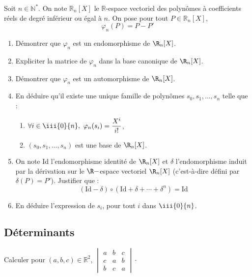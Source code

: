 \documentclass[a4paper,twoside,french,11pt]{VcCours}
\begin{document}
\begin{Exercice}{}
  Soit $n \in \mathbb{N}^*$. On note $\mathbb{R}_n[X]$ le $\mathbb{R}$-espace vectoriel des polynômes à coefficients réels de degré inférieur ou égal à $n$. On pose pour tout $P \in \mathbb{R}_n[X]$,
  $$ \varphi_n(P) = P-P'$$
  
  \begin{enumerate}
    \item Démontrer que $\varphi_n$ est un endomorphisme de $\R_n[X]$.
    \item Expliciter la matrice de $ \varphi_n$ dans la base canonique de $\R_n[X]$.
    \item Démontrer que $\varphi_n$ est un automorphisme de $\R_n[X]$.
    \item En déduire qu'il existe une unique famille de polynômes $s_0,s_1,\ldots,s_n$ telle que :
    \begin{enumerate}
      \item $\forall i \in \iii{0}{n}, \  \varphi_n(s_i)=\dfrac{X^i}{i!}$,
      \item $(s_0,s_1,\ldots,s_n)$ est une base de $\R_n[X]$.
    \end{enumerate}
    \item On note $\textrm{Id}$ l'endomorphisme identité de $\R_n[X]$ et $\delta$ l'endomorphisme induit par la dérivation sur le $\R-$espace vectoriel $\R_n[X]$ (c'est-à-dire défini par $\delta(P)=P'$). Justifier que : 
    $$(\textrm{Id}-\delta)\circ (\textrm{Id} +\delta+\cdots+\delta^n)=\textrm{Id}$$
    \item En déduire l'expression de $s_i$, pour tout $i$ dans $\iii{0}{n}$.
  \end{enumerate}
\end{Exercice} 

\subsection{Déterminants}

\begin{Exercice}{}
  Calculer pour $(a,b,c) \in \mathbb{R}^2$,
  $\begin{vmatrix}
    a & b & c \\
    c & a & b \\
    b & c & a
  \end{vmatrix} \cdot$
\end{Exercice} 
  
\end{document}
